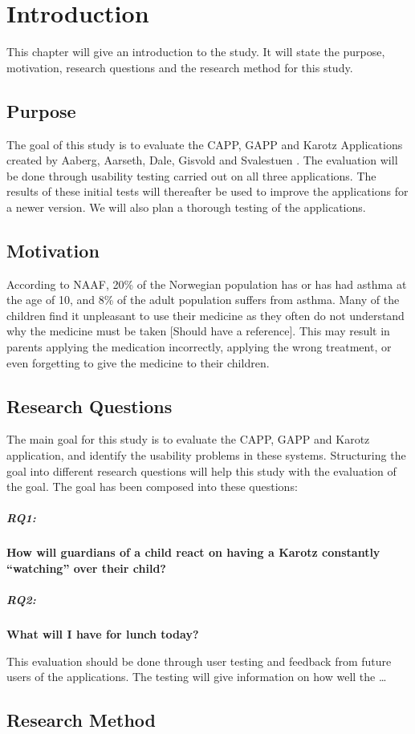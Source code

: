 \chapter{Introduction}
\label{chp:introduction}

This chapter will give an introduction to the study. It will state the purpose, motivation, research questions and the research method for this study. 

\section{Purpose}
\label{sec:purpose}
The goal of this study is to evaluate the CAPP, GAPP and Karotz Applications created by Aaberg, Aarseth, Dale, Gisvold and Svalestuen \cite{CustomerDriven}.
The evaluation will be done through usability testing carried out on all three applications. The results of these initial tests will thereafter be used to improve the applications for a newer version. 
We will also plan a thorough testing of the applications.


\section{Motivation}
\label{sec:motivation}
According to NAAF, 20\% \cite{NAAF} of the Norwegian population has or has had asthma at the age of 10, and 8\% of the adult population suffers from asthma. Many of the children find it unpleasant to use their medicine as they often do not understand why the medicine must be taken [Should have a reference]. This may result in parents applying the medication incorrectly, applying the wrong treatment, or even forgetting to give the medicine to their children. 


\section{Research Questions}
\label{sec:researchquestions}
The main goal for this study is to evaluate the CAPP, GAPP and Karotz application, and identify the usability problems in these systems. Structuring the goal into different research questions will help this study with the evaluation of the goal. The goal has been composed into these questions:

\paragraph{RQ1:}
\textbf{How will guardians of a child react on having a Karotz constantly ``watching'' over their child?}


\paragraph{RQ2:}
\textbf{What will I have for lunch today?}

This evaluation should be done through user testing and feedback from future users of the applications. The testing will give information on how well the 
\ldots

\section{Research Method}
\label{sec:researchmethod}


